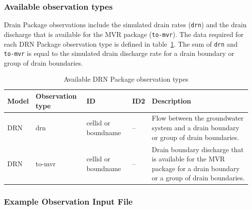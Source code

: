 \vspace{5mm}
\subsubsection{Available observation types}
Drain Package observations include the simulated drain rates (\texttt{drn}) and the drain discharge that is available for the MVR package (\texttt{to-mvr}). The data required for each DRN Package observation type is defined in table~\ref{table:gwf-drnobstype}. The sum of \texttt{drn} and \texttt{to-mvr} is equal to the simulated drain discharge rate for a drain boundary or group of drain boundaries.

\begin{longtable}{p{2cm} p{2.75cm} p{2cm} p{1.25cm} p{7cm}}
\caption{Available DRN Package observation types} \tabularnewline

\hline
\hline
\textbf{Model} & \textbf{Observation type} & \textbf{ID} & \textbf{ID2} & \textbf{Description} \\
\hline
\endhead

\hline
\endfoot

DRN & drn & cellid or boundname & -- & Flow between the groundwater system and a drain boundary or group of drain boundaries. \\
DRN & to-mvr & cellid or boundname & -- & Drain boundary discharge that is available for the MVR package for a drain boundary or a group of drain boundaries.
\label{table:gwf-drnobstype}
\end{longtable}

\vspace{5mm}
\subsubsection{Example Observation Input File}

